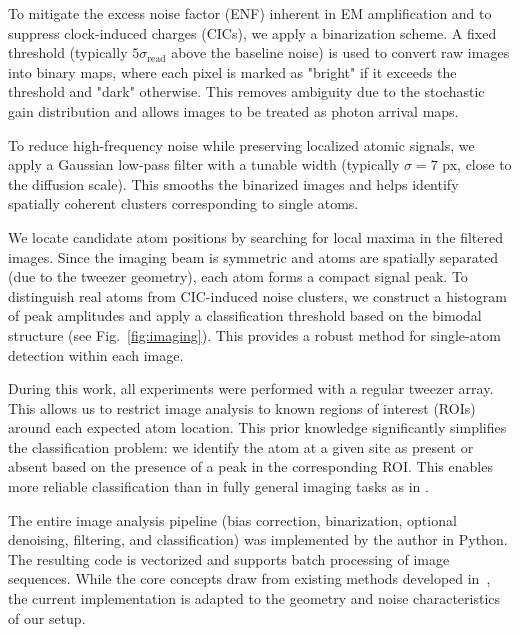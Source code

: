 To mitigate the excess noise factor (ENF) inherent in EM amplification and to suppress clock-induced charges (CICs), we apply a binarization scheme. A fixed threshold (typically $5\sigma_\text{read}$ above the baseline noise) is used to convert raw images into binary maps, where each pixel is marked as "bright" if it exceeds the threshold and "dark" otherwise. This removes ambiguity due to the stochastic gain distribution and allows images to be treated as photon arrival maps.  

To reduce high-frequency noise while preserving localized atomic signals, we apply a Gaussian low-pass filter with a tunable width (typically $\sigma = 7$ px, close to the diffusion scale). This smooths the binarized images and helps identify spatially coherent clusters corresponding to single atoms. 

We locate candidate atom positions by searching for local maxima in the filtered images. Since the imaging beam is symmetric and atoms are spatially separated (due to the tweezer geometry), each atom forms a compact signal peak. To distinguish real atoms from CIC-induced noise clusters, we construct a histogram of peak amplitudes and apply a classification threshold based on the bimodal structure (see Fig.~\ref{fig:imaging}). This provides a robust method for single-atom detection within each image.

During this work, all experiments were performed with a regular tweezer array. This allows us to restrict image analysis to known regions of interest (ROIs) around each expected atom location. This prior knowledge significantly simplifies the classification problem: we identify the atom at a given site as present or absent based on the presence of a peak in the corresponding ROI. This enables more reliable classification than in fully general imaging tasks as in \cite{bergschneider_spin-resolved_2018}.

The entire image analysis pipeline (bias correction, binarization, optional denoising, filtering, and classification) was implemented by the author in Python. The resulting code is vectorized and supports batch processing of image sequences. While the core concepts draw from existing methods developed in~\cite{bergschneider_spin-resolved_2018}, the current implementation is adapted to the geometry and noise characteristics of our setup. 
